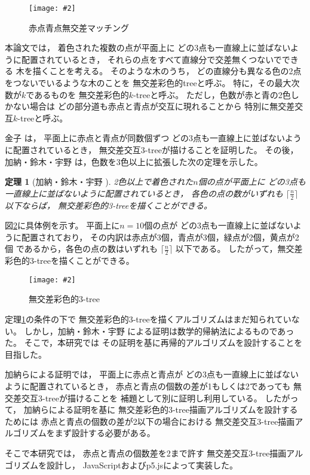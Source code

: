 \documentclass[12pt,a4paper,oneside]{jsbook}
\theoremstyle{plain}
\newtheorem{theorem}{定理}[chapter]
\newcommand{\fig}[4]{
\begin{figure}[H]
\centering
\texttt{[image: \#2]}
\caption{#3}
\label{#4}
\end{figure}
}
\begin{document}
\fig{0.75\textwidth}
{fig_yymmdd_1.pdf}
{赤点青点無交差マッチング}
{fig_yymmdd_3}

本論文では，
着色された複数の点が平面上に
どの3点も一直線上に並ばないように配置されているとき，
それらの点をすべて直線分で交差無くつないでできる
木を描くことを考える。
そのような木のうち，
どの直線分も異なる色の2点をつないでいるような木のことを
無交差彩色的treeと呼ぶ。
特に，その最大次数が$k$であるものを
無交差彩色的$k$-treeと呼ぶ。
ただし，色数が赤と青の2色しかない場合は
どの部分道も赤点と青点が交互に現れることから
特別に無交差交互$k$-treeと呼ぶ。

金子
\cite{Kaneko2000}
は，
平面上に赤点と青点が同数個ずつ
どの3点も一直線上に並ばないように配置されているとき，
無交差交互3-treeが描けることを証明した。
その後，加納・鈴木・宇野
\cite{Kano2014}
は，色数を3色以上に拡張した次の定理を示した。

\begin{theorem}[加納・鈴木・宇野
\cite{Kano2014}]
2色以上で着色された$n$個の点が平面上に
どの3点も一直線上に並ばないように配置されているとき，
各色の点の数がいずれも
$\lceil \frac{n}{2} \rceil$
以下ならば，
無交差彩色的3-treeを描くことができる。
\label{thm20181017_1}
\end{theorem}

図\ref{fig_yymmdd_4}に具体例を示す。
平面上に$n=10$個の点が
どの3点も一直線上に並ばないように配置されており，
その内訳は赤点が3個，青点が3個，緑点が2個，黄点が2個
であるから，各色の点の数はいずれも
$\lceil \frac{n}{2} \rceil$
以下である。
したがって，無交差彩色的3-treeを描くことができる。

\fig{0.75\textwidth}
{fig_yymmdd_1.pdf}
{無交差彩色的3-tree}
{fig_yymmdd_4}

定理\ref{thm20181017_1}の条件の下で
無交差彩色的3-treeを描くアルゴリズムはまだ知られていない。
しかし，加納・鈴木・宇野
\cite{Kano2014}
による証明は数学的帰納法によるものであった。
そこで，本研究では
その証明を基に再帰的アルゴリズムを設計することを目指した。

加納らによる証明では，
平面上に赤点と青点が
どの3点も一直線上に並ばないように配置されているとき，
赤点と青点の個数の差が1もしくは2であっても
無交差交互3-treeが描けることを
補題として別に証明し利用している。
したがって，
加納らによる証明を基に
無交差彩色的3-tree描画アルゴリズムを設計するためには
赤点と青点の個数の差が2以下の場合における
無交差交互3-tree描画アルゴリズムをまず設計する必要がある。

そこで本研究では，
赤点と青点の個数差を2まで許す
無交差交互3-tree描画アルゴリズムを設計し，
JavaScriptおよびp5.jsによって実装した。
\end{document}
